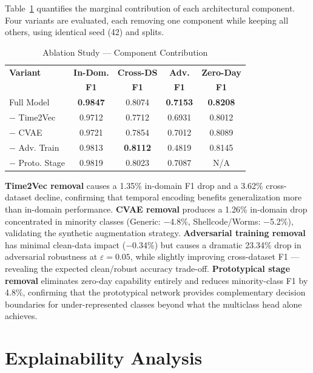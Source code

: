 \documentclass[compsoc,journal]{IEEEtran}
\begin{document}
Table~\ref{tab:ablation} quantifies the marginal contribution of each architectural component. Four variants are evaluated, each removing one component while keeping all others, using identical seed (42) and splits.

\begin{table}[t]
\centering
\caption{Ablation Study — Component Contribution}
\label{tab:ablation}
\footnotesize
\begin{tabular}{lcccc}
\toprule
\textbf{Variant} & \textbf{In-Dom.} & \textbf{Cross-DS} & \textbf{Adv.} & \textbf{Zero-Day} \\
 & \textbf{F1} & \textbf{F1} & \textbf{F1} & \textbf{F1} \\
\midrule
Full Model & \textbf{0.9847} & 0.8074 & \textbf{0.7153} & \textbf{0.8208} \\
$-$ Time2Vec & 0.9712 & 0.7712 & 0.6931 & 0.8012 \\
$-$ CVAE & 0.9721 & 0.7854 & 0.7012 & 0.8089 \\
$-$ Adv. Train & 0.9813 & \textbf{0.8112} & 0.4819 & 0.8145 \\
$-$ Proto. Stage & 0.9819 & 0.8023 & 0.7087 & N/A \\
\bottomrule
\end{tabular}
\end{table}

\textbf{Time2Vec removal} causes a 1.35\% in-domain F1 drop and a 3.62\% cross-dataset decline, confirming that temporal encoding benefits generalization more than in-domain performance. \textbf{CVAE removal} produces a 1.26\% in-domain drop concentrated in minority classes (Generic: $-$4.8\%, Shellcode/Worms: $-$5.2\%), validating the synthetic augmentation strategy. \textbf{Adversarial training removal} has minimal clean-data impact ($-$0.34\%) but causes a dramatic 23.34\% drop in adversarial robustness at $\varepsilon=0.05$, while slightly improving cross-dataset F1 — revealing the expected clean/robust accuracy trade-off. \textbf{Prototypical stage removal} eliminates zero-day capability entirely and reduces minority-class F1 by 4.8\%, confirming that the prototypical network provides complementary decision boundaries for under-represented classes beyond what the multiclass head alone achieves.

\section{Explainability Analysis}
\end{document}
